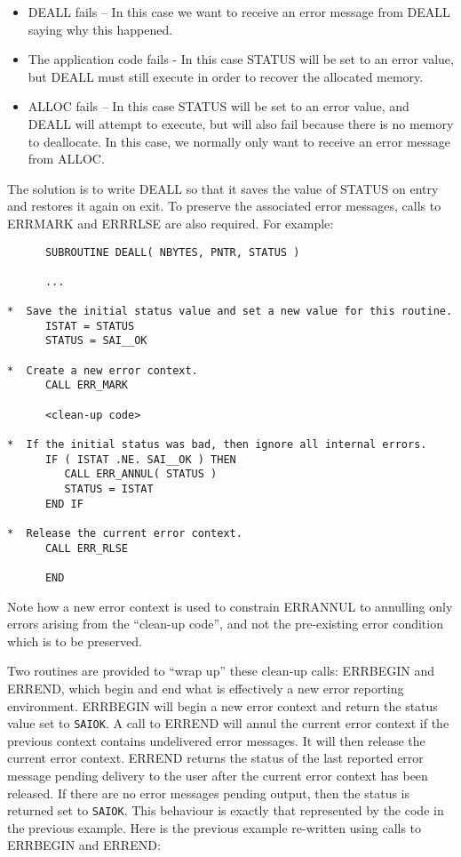 \documentclass[twoside,11pt]{article}
\renewcommand{\_}{\texttt{\symbol{95}}}
\newcommand{\const}[1]{\texttt{#1}}
\newcommand{\saiok}{\const{SAI\_\_OK}}
\begin{document}
\begin{itemize}
\item DEALL fails -- In this case we want to receive an error message from
DEALL saying why this happened.

\item The application code fails - In this case STATUS will be set to an
error value, but DEALL must still execute in order to recover the allocated
memory.

\item ALLOC fails -- In this case STATUS will be set to an error value, and
DEALL will attempt to execute, but will also fail because there is no memory
to deallocate.
In this case, we normally only want to receive an error message from ALLOC.
\end {itemize}

The solution is to write DEALL so that it saves the value of STATUS on entry
and restores it again on exit.
To preserve the associated error messages, calls to ERR\_MARK and ERR\_RLSE
are also required.
For example:


\begin {small}
\begin{verbatim}
      SUBROUTINE DEALL( NBYTES, PNTR, STATUS )

      ...

*  Save the initial status value and set a new value for this routine.
      ISTAT = STATUS
      STATUS = SAI__OK

*  Create a new error context.
      CALL ERR_MARK

      <clean-up code>

*  If the initial status was bad, then ignore all internal errors.
      IF ( ISTAT .NE. SAI__OK ) THEN
         CALL ERR_ANNUL( STATUS )
         STATUS = ISTAT
      END IF

*  Release the current error context.
      CALL ERR_RLSE

      END
\end{verbatim}
\end {small}

Note how a new error context is used to constrain ERR\_ANNUL to annulling
only errors arising from the ``clean-up code'', and not the pre-existing
error condition which is to be preserved.

Two routines are provided to ``wrap up'' these clean-up calls: ERR\_BEGIN and
ERR\_END, which begin and end what is effectively a new error reporting
environment.
ERR\_BEGIN will begin a new error context and return the
status value set to \saiok.
A call to ERR\_END will annul the current error context if the previous
context contains undelivered error messages.
It will then release the current error context.
ERR\_END returns the status of the last reported error message pending
delivery to the user after the current error context has been released.
If there are no error messages pending output, then the status is
returned set to \saiok.
This behaviour is exactly that represented by the code in the previous example.
Here is the previous example re-written using calls to ERR\_BEGIN and
ERR\_END:
\end{document}
